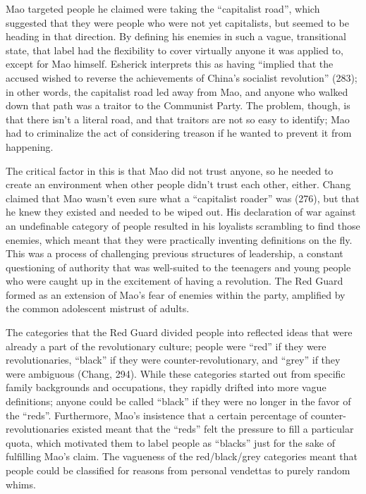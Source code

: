 Mao targeted people he claimed were taking the “capitalist road”,
which suggested that they were people who were not yet capitalists,
but seemed to be heading in that direction. By defining his enemies
in such a vague, transitional state, that label had the flexibility
to cover virtually anyone it was applied to, except for Mao himself.
Esherick interprets this as having “implied that the accused wished
to reverse the achievements of China's socialist revolution” (283);
in other words, the capitalist road led away from Mao, and anyone
who walked down that path was a traitor to the Communist Party. The
problem, though, is that there isn't a literal road, and that
traitors are not so easy to identify; Mao had to criminalize the act
of considering treason if he wanted to prevent it from happening.

The critical factor in this is that Mao did not trust anyone, so
he needed to create an environment when other people didn't
trust each other, either. Chang claimed that Mao wasn't even
sure what a “capitalist roader” was (276), but that he knew they
existed and needed to be wiped out. His declaration of war
against an undefinable category of people resulted in his
loyalists scrambling to find those enemies, which meant that
they were practically inventing definitions on the fly. This was
a process of challenging previous structures of leadership, a
constant questioning of authority that was well-suited to the
teenagers and young people who were caught up in the excitement
of having a revolution. The Red Guard formed as an extension of
Mao's fear of enemies within the party, amplified by the common
adolescent mistrust of adults.

The categories that the Red Guard divided people into
reflected ideas that were already a part of the
revolutionary culture; people were “red” if they were
revolutionaries, “black” if they were counter-revolutionary,
and “grey” if they were ambiguous (Chang, 294). While these
categories started out from specific family backgrounds and
occupations, they rapidly drifted into more vague
definitions; anyone could be called “black” if they were no
longer in the favor of the “reds”. Furthermore, Mao's
insistence that a certain percentage of
counter-revolutionaries existed meant that the “reds” felt
the pressure to fill a particular quota, which motivated
them to label people as “blacks” just for the sake of
fulfilling Mao's claim. The vagueness of the red/black/grey
categories meant that people could be classified for reasons
from personal vendettas to purely random whims.

